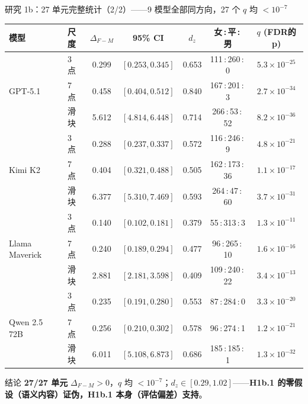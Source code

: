 \documentclass[aspectratio=169,professionalfonts]{beamer}
\begin{document}
\begin{frame}{研究 1b：27 单元完整统计（2/2）——9 模型全部同方向，27 个 $q$ 均 $<10^{-7}$}
  \scriptsize
  \setlength{\tabcolsep}{3pt}
  \renewcommand{\arraystretch}{0.9}
  \begin{table}
    \centering
    \begin{tabular}{llccccc}
      \toprule
      模型 & 尺度 & $\Delta_{F-M}$ & 95\% CI & $d_z$ & 女\,:\,平\,:\,男 & $q$ (FDR的p) \\
      \midrule
      \multirow{3}{*}{GPT-5.1}
        & 3 点    & 0.299 & $[0.253, 0.345]$ & 0.653 & 111\,:\,260\,:\,0  & $5.3\!\times\!10^{-25}$ \\
        & 7 点    & 0.458 & $[0.404, 0.512]$ & 0.840 & 167\,:\,201\,:\,3  & $2.7\!\times\!10^{-34}$ \\
        & 滑块    & 5.612 & $[4.814, 6.448]$ & 0.714 & 266\,:\,53\,:\,52  & $8.2\!\times\!10^{-36}$ \\
      \midrule
      \multirow{3}{*}{Kimi K2}
        & 3 点    & 0.288 & $[0.237, 0.337]$ & 0.572 & 116\,:\,246\,:\,9  & $4.8\!\times\!10^{-21}$ \\
        & 7 点    & 0.404 & $[0.321, 0.488]$ & 0.505 & 162\,:\,173\,:\,36 & $1.1\!\times\!10^{-17}$ \\
        & 滑块    & 6.377 & $[5.310, 7.469]$ & 0.593 & 264\,:\,47\,:\,60  & $3.7\!\times\!10^{-31}$ \\
      \midrule
      \multirow{3}{*}{Llama Maverick}
        & 3 点    & 0.140 & $[0.102, 0.181]$ & 0.379 & 55\,:\,313\,:\,3   & $1.3\!\times\!10^{-11}$ \\
        & 7 点    & 0.240 & $[0.189, 0.294]$ & 0.477 & 96\,:\,265\,:\,10  & $1.6\!\times\!10^{-16}$ \\
        & 滑块    & 2.881 & $[2.181, 3.598]$ & 0.409 & 109\,:\,240\,:\,22 & $3.4\!\times\!10^{-13}$ \\
      \midrule
      \multirow{3}{*}{Qwen 2.5 72B}
        & 3 点    & 0.235 & $[0.191, 0.280]$ & 0.553 & 87\,:\,284\,:\,0   & $3.3\!\times\!10^{-20}$ \\
        & 7 点    & 0.256 & $[0.210, 0.302]$ & 0.578 & 96\,:\,274\,:\,1   & $1.2\!\times\!10^{-21}$ \\
        & 滑块    & 6.011 & $[5.108, 6.873]$ & 0.686 & 185\,:\,185\,:\,1  & $1.3\!\times\!10^{-32}$ \\
      \bottomrule
    \end{tabular}
  \end{table}
  \begin{alertblock}{结论}
    \scriptsize \textbf{27/27 单元} $\Delta_{F-M}>0$，$q$ 均 $<10^{-7}$；$d_z \in [0.29, 1.02]$——\textbf{H1b.1 的零假设（语义内容）证伪，H1b.1 本身（评估偏差）支持}。
  \end{alertblock}
\end{frame}
\end{document}
